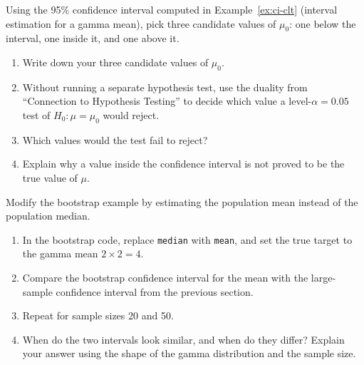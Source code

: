 \begin{exercise}
Using the 95\% confidence interval computed in
Example~\ref{ex:ci-clt} (interval estimation for a gamma mean), pick
three candidate values of $\mu_0$: one below the interval, one inside
it, and one above it.
\begin{enumerate}[label=(\alph*)]
\item Write down your three candidate values of $\mu_0$.
\item Without running a separate hypothesis test, use the duality from
  ``Connection to Hypothesis Testing'' to decide which value a
  level-$\alpha = 0.05$ test of $H_0: \mu = \mu_0$ would reject.
\item Which values would the test fail to reject?
\item Explain why a value inside the confidence interval is not proved
  to be the true value of $\mu$.
\end{enumerate}
\end{exercise}

\begin{exercise}
Modify the bootstrap example by estimating the population mean instead
of the population median.
\begin{enumerate}[label=(\alph*)]
\item In the bootstrap code, replace \lstinline{median} with
  \lstinline{mean}, and set the true target to the gamma mean
  $2 \times 2 = 4$.
\item Compare the bootstrap confidence interval for the mean with the
  large-sample confidence interval from the previous section.
\item Repeat for sample sizes 20 and 50.
\item When do the two intervals look similar, and when do they differ?
  Explain your answer using the shape of the gamma distribution and the
  sample size.
\end{enumerate}
\end{exercise}

